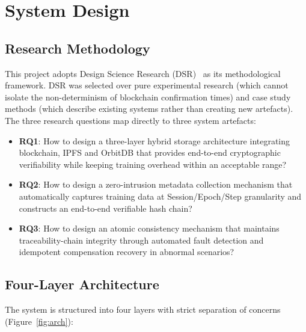 \documentclass[10pt,twocolumn]{article}
\begin{document}
\section{System Design}

\subsection{Research Methodology}

This project adopts Design Science Research (DSR)~\cite{hevner2004} as its methodological
framework. DSR was selected over pure experimental research (which cannot isolate the
non-determinism of blockchain confirmation times) and case study methods (which describe
existing systems rather than creating new artefacts). The three research questions map
directly to three system artefacts:

\begin{itemize}[leftmargin=*, nosep]
  \item \textbf{RQ1}: How to design a three-layer hybrid storage architecture integrating
        blockchain, IPFS and OrbitDB that provides end-to-end cryptographic verifiability
        while keeping training overhead within an acceptable range?
  \item \textbf{RQ2}: How to design a zero-intrusion metadata collection mechanism that
        automatically captures training data at Session/Epoch/Step granularity and constructs
        an end-to-end verifiable hash chain?
  \item \textbf{RQ3}: How to design an atomic consistency mechanism that maintains
        traceability-chain integrity through automated fault detection and idempotent
        compensation recovery in abnormal scenarios?
\end{itemize}

\subsection{Four-Layer Architecture}

The system is structured into four layers with strict separation of concerns
(Figure~\ref{fig:arch}):
\end{document}
